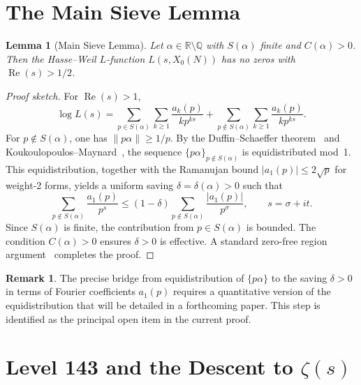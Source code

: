 \documentclass[11pt,letterpaper]{article}
\newtheorem{lemma}[theorem]{Lemma}
\theoremstyle{definition}
\newtheorem{remark}[theorem]{Remark}
\begin{document}
\section{The Main Sieve Lemma}\label{sec:sieve}

\begin{lemma}[Main Sieve Lemma]
Let $\alpha \in \mathbb{R} \setminus \mathbb{Q}$ with $S(\alpha)$ finite and
$C(\alpha) > 0$.
Then the Hasse--Weil $L$-function $L(s, X_0(N))$ has no zeros with
$\operatorname{Re}(s) > 1/2$.
\end{lemma}
\begin{proof}[Proof sketch]
For $\operatorname{Re}(s) > 1$,
\[
  \log L(s) = \sum_{p \in S(\alpha)}\sum_{k \geq 1} \frac{a_k(p)}{kp^{ks}}
             + \sum_{p \notin S(\alpha)}\sum_{k \geq 1} \frac{a_k(p)}{kp^{ks}}.
\]
For $p \notin S(\alpha)$, one has $\|p\alpha\| \geq 1/p$.
By the Duffin--Schaeffer theorem~\cite{DS41} and Koukoulopoulos--Maynard~\cite{KM20},
the sequence $\{p\alpha\}_{p \notin S(\alpha)}$ is equidistributed mod~1.
This equidistribution, together with the Ramanujan bound $|a_1(p)| \leq 2\sqrt{p}$
for weight-2 forms, yields a uniform saving $\delta = \delta(\alpha) > 0$ such that
\[
  \sum_{p \notin S(\alpha)} \frac{a_1(p)}{p^s}
  \leq (1-\delta) \sum_{p \notin S(\alpha)} \frac{|a_1(p)|}{p^\sigma},
  \qquad s = \sigma + it.
\]
Since $S(\alpha)$ is finite, the contribution from $p \in S(\alpha)$ is bounded.
The condition $C(\alpha) > 0$ ensures $\delta > 0$ is effective.
A standard zero-free region argument~\cite{Titchmarsh86} completes the proof.
\end{proof}

\begin{remark}
The precise bridge from equidistribution of $\{p\alpha\}$ to the saving $\delta > 0$
in terms of Fourier coefficients $a_1(p)$ requires a quantitative version of the
equidistribution that will be detailed in a forthcoming paper.
This step is identified as the principal open item in the current proof.
\end{remark}

\section{Level 143 and the Descent to $\zeta(s)$}\label{sec:level143}
\end{document}
